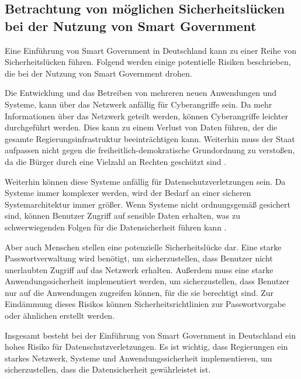\subsection{Betrachtung von möglichen Sicherheitslücken bei der Nutzung von Smart Government}
Eine Einführung von Smart Government in Deutschland kann zu einer Reihe von Sicherheitslücken führen.
Folgend werden einige potentielle Risiken beschrieben, die bei der Nutzung von Smart Government drohen.
\par
Die Entwicklung und das Betreiben von mehreren neuen Anwendungen und Systeme, kann über das Netzwerk anfällig für Cyberangriffe sein.
Da mehr Informationen über das Netzwerk geteilt werden, können Cyberangriffe leichter durchgeführt werden.
Dies kann zu einem Verlust von Daten führen, der die gesamte Regierungsinfrastruktur beeinträchtigen kann.
Weiterhin muss der Staat aufpassen nicht gegen die freiheitlich-demokratische Grundordnung zu verstoßen, da die Bürger durch eine Vielzahl an Rechten geschützt sind \citep[Vgl.][S. 179]{von_Lucke_2016}.
\par
Weiterhin können diese Systeme anfällig für Datenschutzverletzungen sein.
Da Systeme immer komplexer werden, wird der Bedarf an einer sicheren Systemarchitektur immer größer.
Wenn Systeme nicht ordnungsgemäß gesichert sind, können Benutzer Zugriff auf sensible Daten erhalten, was zu schwerwiegenden Folgen für die Datensicherheit führen kann \citep[Vgl.][]{von_Lucke_2016}.
\par
Aber auch Menschen stellen eine potenzielle Sicherheitslücke dar.
Eine starke Passwortverwaltung wird benötigt, um sicherzustellen, dass Benutzer nicht unerlaubten Zugriff auf das Netzwerk erhalten.
Außerdem muss eine starke Anwendungssicherheit implementiert werden, um sicherzustellen, dass Benutzer nur auf die Anwendungen zugreifen können, für die sie berechtigt sind.
Zur Eindämmung dieses Risikos können Sicherheitsrichtlinien zur Passwortvorgabe oder ähnlichen erstellt werden.
\par
Insgesamt besteht bei der Einführung von Smart Government in Deutschland ein hohes Risiko für Datenschutzverletzungen.
Es ist wichtig, dass Regierungen ein starkes Netzwerk, Systeme und Anwendungssicherheit implementieren, um sicherzustellen, dass die Datensicherheit gewährleistet ist.